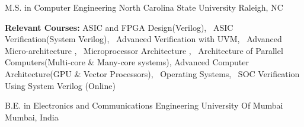 \par\addvspace{0ex}


\begin{cventries}

  \cventry
    {M.S. in Computer Engineering} %
    {North Carolina State University} %
    {Raleigh, NC} %
    {\color{darkgray}{Aug. 2017 - Expected May. 2019}} %
    {
      \begin{cvitems} %
        \item \textbf{Relevant Courses:} {ASIC and FPGA Design(Verilog), \ ASIC Verification(System Verilog), \  Advanced Verification with UVM, \  Advanced Micro-architecture , \ Microprocessor Architecture , \ Architecture of Parallel Computers(Multi-core \& Many-core systems),  Advanced Computer Architecture(GPU \& Vector Processors), \ Operating Systems, \  SOC Verification Using System Verilog (Online)}
      \end{cvitems}
    }
    \par\addvspace{-1ex}
    \cventry
    {B.E. in Electronics and Communications Engineering} %
    {University Of Mumbai} %
    {Mumbai, India} %
    {\color{darkgray}{Aug. 2013 - May.2017}} %
    {
    }

\end{cventries}
